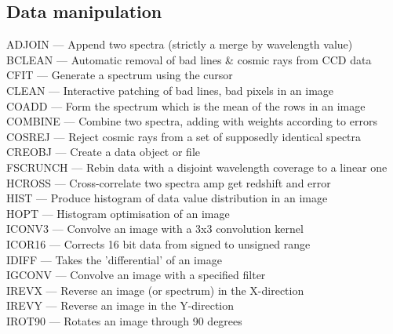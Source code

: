 \documentclass[11pt,twoside]{article}
\newcommand{\htmlref}[2]{#1}
\begin{document}

\subsection{\label{classifmanip}Data manipulation}

\htmlref{ADJOIN}{ADJOIN} --- Append two spectra (strictly a merge by wavelength value)\\
\htmlref{BCLEAN}{BCLEAN} --- Automatic removal of bad lines \& cosmic rays from CCD data\\
\htmlref{CFIT}{CFIT} --- Generate a spectrum using the cursor\\
\htmlref{CLEAN}{CLEAN} --- Interactive patching of bad lines, bad pixels in an image\\
\htmlref{COADD}{COADD} --- Form the spectrum which is the mean of the rows in an image\\
\htmlref{COMBINE}{COMBINE} --- Combine two spectra, adding with weights according to errors\\
\htmlref{COSREJ}{COSREJ} --- Reject cosmic rays from a set of supposedly identical spectra\\
\htmlref{CREOBJ}{CREOBJ} --- Create a data object or file\\
\htmlref{FSCRUNCH}{FSCRUNCH} --- Rebin data with a disjoint wavelength coverage to a linear one\\
\htmlref{HCROSS}{HCROSS} --- Cross-correlate two spectra amp get redshift and error\\
\htmlref{HIST}{HIST} --- Produce histogram of data value distribution in an image\\
\htmlref{HOPT}{HOPT} --- Histogram optimisation of an image\\
\htmlref{ICONV3}{ICONV3} --- Convolve an image with a 3x3 convolution kernel\\
\htmlref{ICOR16}{ICOR16} --- Corrects 16 bit data from signed to unsigned range\\
\htmlref{IDIFF}{IDIFF} --- Takes the 'differential' of an image\\
\htmlref{IGCONV}{IGCONV} --- Convolve an image with a specified filter\\
\htmlref{IREVX}{IREVX} --- Reverse an image (or spectrum) in the X-direction\\
\htmlref{IREVY}{IREVY} --- Reverse an image in the Y-direction\\
\htmlref{IROT90}{IROT90} --- Rotates an image through 90 degrees\\
\end{document}
